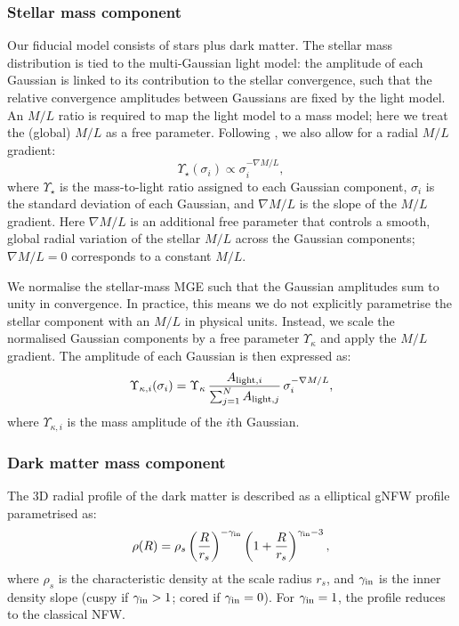 \documentclass[fleqn,usenatbib]{mnras}
\begin{document}
\subsubsection{Stellar mass component}
Our fiducial model consists of stars plus dark matter. The stellar mass distribution is tied to the multi-Gaussian light model: the amplitude of each Gaussian is linked to its contribution to the stellar convergence, such that the relative convergence amplitudes between Gaussians are fixed by the light model. An $M/L$ ratio is required to map the light model to a mass model; here we treat the (global) $M/L$ as a free parameter. Following \citet{Oldham2018}, we also allow for a radial $M/L$ gradient:
\begin{equation}
\Upsilon_{\star}(\sigma_i) \propto \sigma_i^{-\nabla M/L},
\end{equation}
where $\Upsilon_{\star}$ is the mass-to-light ratio assigned to each Gaussian component, $\sigma_i$ is the standard deviation of each Gaussian, and $\nabla M/L$ is the slope of the $M/L$ gradient. Here $\nabla M/L$ is an additional free parameter that controls a smooth, global radial variation of the stellar $M/L$ across the Gaussian components; $\nabla M/L=0$ corresponds to a constant $M/L$.

We normalise the stellar-mass MGE such that the Gaussian amplitudes sum to unity in convergence.  In practice, this means we do not explicitly parametrise the stellar component with an $M/L$ in physical units. Instead, we scale the normalised Gaussian components by a free parameter $\Upsilon_\kappa$ and apply the $M/L$ gradient. The amplitude of each Gaussian is then expressed as:
\begin{equation}
\Upsilon_{\kappa,i}(\sigma_i)=
\Upsilon_{\kappa}\,
\frac{A_{{\rm light},i}}{\sum_{j=1}^{N} A_{{\rm light},j}}\,
\sigma_i^{-\nabla M/L},
\end{equation}
where $\Upsilon_{\kappa,i}$ is the mass amplitude of the $i$th Gaussian.

\subsubsection{Dark matter mass component}
The 3D radial profile of the dark matter is described as a elliptical gNFW profile parametrised as:
\begin{equation}
\rho(R)=\rho_s\left(\frac{R}{r_s}\right)^{-\gamma_{\rm in}}
\left(1+\frac{R}{r_s}\right)^{\gamma_{\rm in}-3},
\end{equation}
where $\rho_s$ is the characteristic density at the scale radius $r_s$, and
$\gamma_{\rm in}$ is the inner density slope (cuspy if $\gamma_{\rm in}>1$; cored if $\gamma_{\rm in}=0$).
For $\gamma_{\rm in}=1$, the profile reduces to the classical NFW.
\end{document}

